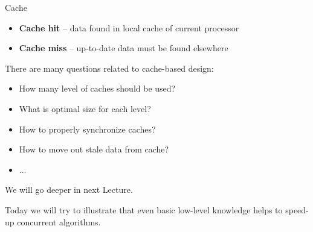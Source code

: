 \begin{frame}{Cache}

\begin{itemize}
  \item \textbf{Cache hit} -- data found in local cache of current processor
  \item \textbf{Cache miss} -- up-to-date data must be found elsewhere
\end{itemize}

\pause

There are many questions related to cache-based design:
\begin{itemize}
  \item How many level of caches should be used?
  \item What is optimal size for each level?
  \item How to properly synchronize caches?
  \item How to move out stale data from cache?
  \item ... 
\end{itemize}

\pause

We will go deeper in next Lecture.

\pause

Today we will try to illustrate that even basic low-level knowledge helps to speed-up concurrent algorithms.

\end{frame}


